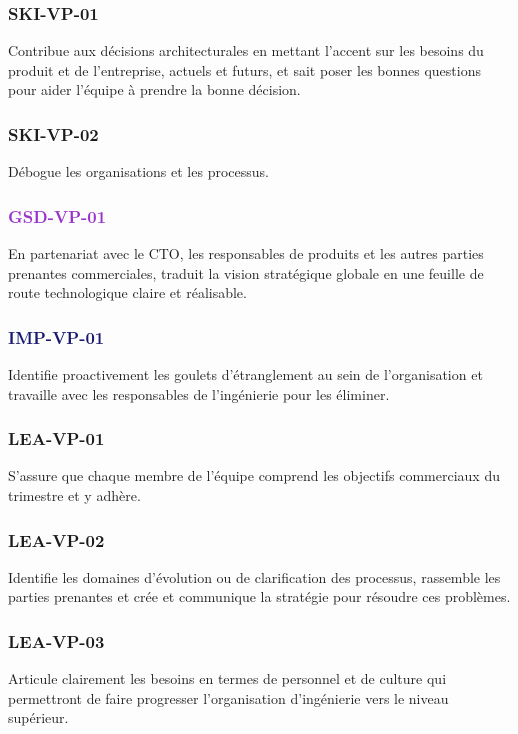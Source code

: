\documentclass[a4paper, french, openany, 12pt]{book}
\newcommand\dex[1]{\textcolor{BrickRed}{\textbf{\uppercase{ski-{#1}}}}}
\newcommand\str[1]{\textcolor{DarkOrchid}{\textbf{\uppercase{gsd-{#1}}}}}
\newcommand\wis[1]{\textcolor{MidnightBlue}{\textbf{\uppercase{imp-{#1}}}}}
\newcommand\cha[1]{\textcolor{OliveGreen}{\textbf{\uppercase{lea-{#1}}}}}
\begin{document}
\begin{multicols}{2}

  \subsubsection*{\dex{vp-01}}
  
  Contribue aux décisions architecturales en mettant l'accent sur les besoins du produit et de l'entreprise,
  actuels et futurs, et sait poser les bonnes questions pour aider l'équipe à prendre la bonne décision.
  
  \subsubsection*{\dex{vp-02}}

  Débogue les organisations et les processus.

  \subsubsection*{\str{vp-01}}

  En partenariat avec le CTO, les responsables de produits et les autres parties prenantes commerciales, 
  traduit la vision stratégique globale en une feuille de route technologique claire et réalisable.

  \subsubsection*{\wis{vp-01}}

  Identifie proactivement les goulets d'étranglement au sein de l'organisation et travaille avec les
  responsables de l'ingénierie pour les éliminer.

  \subsubsection*{\cha{vp-01}}

  S'assure que chaque membre de l'équipe comprend les objectifs commerciaux du trimestre et y adhère.
  
  \subsubsection*{\cha{vp-02}}

  Identifie les domaines d'évolution ou de clarification des processus, rassemble les parties prenantes et crée et 
  communique la stratégie pour résoudre ces problèmes.
  
  \subsubsection*{\cha{vp-03}}

  Articule clairement les besoins en termes de personnel et de culture qui permettront de faire progresser l'organisation
  d'ingénierie vers le niveau supérieur.

\end{multicols}
\end{document}
